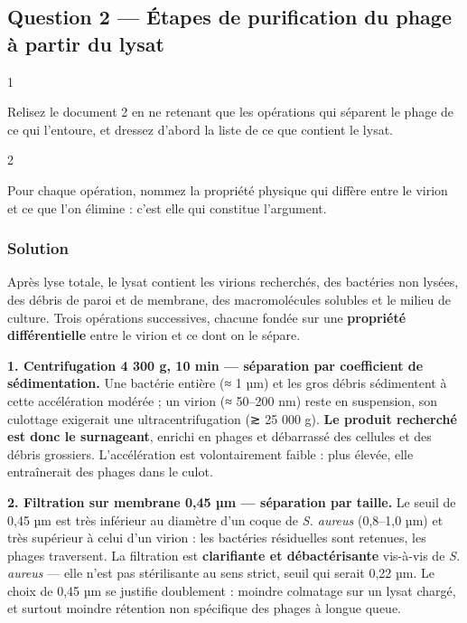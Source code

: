 \documentclass[11pt,a4paper]{article}
\begin{document}
\hypertarget{question-2-uxe9tapes-de-purification-du-phage-uxe0-partir-du-lysat}{%
\subsection{Question 2 --- Étapes de purification du phage à partir du lysat}\label{question-2-uxe9tapes-de-purification-du-phage-uxe0-partir-du-lysat}}

\begin{indication}{1}

Relisez le document 2 en ne retenant que les opérations qui séparent le phage de ce qui l'entoure, et dressez d'abord la liste de ce que contient le lysat.

\end{indication}

\begin{indication}{2}

Pour chaque opération, nommez la propriété physique qui diffère entre le virion et ce que l'on élimine : c'est elle qui constitue l'argument.

\end{indication}

\hypertarget{solution-1}{%
\subsubsection{Solution}\label{solution-1}}

Après lyse totale, le lysat contient les virions recherchés, des bactéries non lysées, des débris de paroi et de membrane, des macromolécules solubles et le milieu de culture. Trois opérations successives, chacune fondée sur une \textbf{propriété différentielle} entre le virion et ce dont on le sépare.

\textbf{1. Centrifugation 4 300 g, 10 min --- séparation par coefficient de sédimentation.} Une bactérie entière (≈ 1 µm) et les gros débris sédimentent à cette accélération modérée ; un virion (≈ 50--200 nm) reste en suspension, son culottage exigerait une ultracentrifugation (≳ 25 000 g). \textbf{Le produit recherché est donc le surnageant}, enrichi en phages et débarrassé des cellules et des débris grossiers. L'accélération est volontairement faible : plus élevée, elle entraînerait des phages dans le culot.

\textbf{2. Filtration sur membrane 0,45 µm --- séparation par taille.} Le seuil de 0,45 µm est très inférieur au diamètre d'un coque de \emph{S. aureus} (0,8--1,0 µm) et très supérieur à celui d'un virion : les bactéries résiduelles sont retenues, les phages traversent. La filtration est \textbf{clarifiante et débactérisante} vis-à-vis de \emph{S. aureus} --- elle n'est pas stérilisante au sens strict, seuil qui serait 0,22 µm. Le choix de 0,45 µm se justifie doublement : moindre colmatage sur un lysat chargé, et surtout moindre rétention non spécifique des phages à longue queue.
\end{document}
